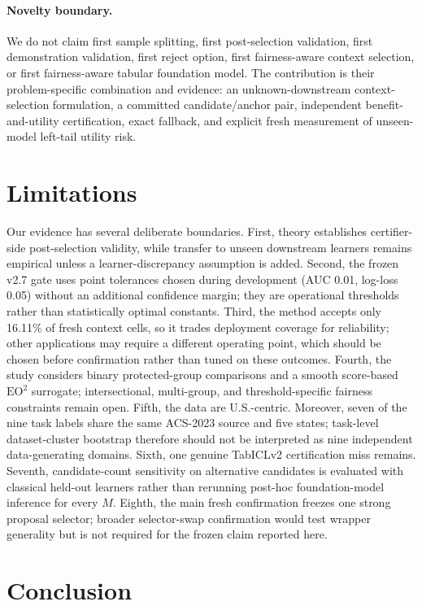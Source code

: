 \documentclass[10pt]{article}
\newcommand{\eo}{\mathrm{EO}^2}
\begin{document}
\paragraph{Novelty boundary.}
We do not claim first sample splitting, first post-selection validation, first demonstration validation, first reject option, first fairness-aware context selection, or first fairness-aware tabular foundation model.
The contribution is their problem-specific combination and evidence: an unknown-downstream context-selection formulation, a committed candidate/anchor pair, independent benefit-and-utility certification, exact fallback, and explicit fresh measurement of unseen-model left-tail utility risk.

\section{Limitations}

Our evidence has several deliberate boundaries.
First, theory establishes certifier-side post-selection validity, while transfer to unseen downstream learners remains empirical unless a learner-discrepancy assumption is added.
Second, the frozen v2.7 gate uses point tolerances chosen during development (AUC 0.01, log-loss 0.05) without an additional confidence margin; they are operational thresholds rather than statistically optimal constants.
Third, the method accepts only 16.11\% of fresh context cells, so it trades deployment coverage for reliability; other applications may require a different operating point, which should be chosen before confirmation rather than tuned on these outcomes.
Fourth, the study considers binary protected-group comparisons and a smooth score-based $\eo$ surrogate; intersectional, multi-group, and threshold-specific fairness constraints remain open.
Fifth, the data are U.S.-centric. Moreover, seven of the nine task labels share the same ACS-2023 source and five states; task-level dataset-cluster bootstrap therefore should not be interpreted as nine independent data-generating domains.
Sixth, one genuine TabICLv2 certification miss remains.
Seventh, candidate-count sensitivity on alternative candidates is evaluated with classical held-out learners rather than rerunning post-hoc foundation-model inference for every $M$.
Eighth, the main fresh confirmation freezes one strong proposal selector; broader selector-swap confirmation would test wrapper generality but is not required for the frozen claim reported here.

\section{Conclusion}
\end{document}
